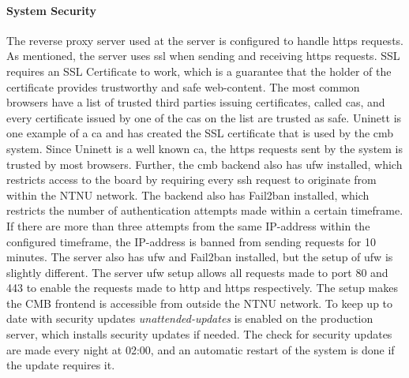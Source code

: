 \paragraph*{System Security} The reverse proxy server used at the server is configured to handle \gls{https} requests. As mentioned, the server uses \gls{ssl} when sending and receiving \gls{https} requests. SSL requires an SSL Certificate to work, which is a guarantee that the holder of the certificate provides trustworthy and safe web-content. The most common browsers have a list of trusted third parties issuing certificates, called \gls{cas}, and every certificate issued by one of the \gls{cas} on the list are trusted as safe. Uninett is one example of a \gls{ca} and has created the SSL certificate that is used by the \gls{cmb} system. Since Uninett is a well known \gls{ca}, the \gls{https} requests sent by the system is trusted by most browsers. Further, the \gls{cmb} backend also has \gls{ufw} \cite{UFW} installed, which restricts access to the board by requiring every \gls{ssh} request to originate from within the NTNU network. The backend also has Fail2ban  \cite{FAIL2BAN} installed, which restricts the number of authentication attempts made within a certain timeframe. If there are more than three attempts from the same IP-address within the configured timeframe, the IP-address is banned from sending requests for 10 minutes. The server also has \gls{ufw} and Fail2ban installed, but the setup of \gls{ufw} is slightly different. The server \gls{ufw} setup allows all requests made to port 80 and 443 to enable the requests made to \gls{http} and \gls{https} respectively. The setup makes the CMB frontend is accessible from outside the NTNU network. To keep up to date with security updates \textit{unattended-updates} \cite{UNATTENDED} is enabled on the production server, which installs security updates if needed. The check for security updates are made every night at 02:00, and an automatic restart of the system is done if the update requires it.

\clearpage

